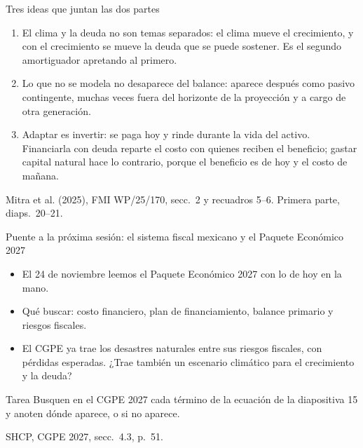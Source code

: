 \documentclass[aspectratio=169,11pt]{beamer}
\newcommand{\fuente}[1]{\par\vfill{\small\color{cGris}#1\par}}
\newcommand{\FMI}{Mitra et al. (2025), FMI WP/25/170}
\begin{document}
\begin{frame}{Tres ideas que juntan las dos partes}
  \begin{enumerate}
    \item<1-> El clima y la deuda no son temas separados: el clima mueve el crecimiento, y con el crecimiento se mueve la deuda que se puede sostener. Es el segundo amortiguador apretando al primero.
    \item<2-> Lo que no se modela no desaparece del balance: aparece después como pasivo contingente, muchas veces fuera del horizonte de la proyección y a cargo de otra generación.
    \item<3-> Adaptar es invertir: se paga hoy y rinde durante la vida del activo. Financiarla con deuda reparte el costo con quienes reciben el beneficio; gastar capital natural hace lo contrario, porque el beneficio es de hoy y el costo de mañana.
  \end{enumerate}
  \fuente{\FMI, secc.~2 y recuadros 5--6. Primera parte, diaps.~20--21.}
\end{frame}

\begin{frame}{Puente a la próxima sesión: el sistema fiscal mexicano y el Paquete Económico 2027}
  \begin{itemize}
    \item<1-> El 24 de noviembre leemos el Paquete Económico 2027 con lo de hoy en la mano.
    \item<2-> Qué buscar: costo financiero, plan de financiamiento, balance primario y riesgos fiscales.
    \item<3-> El CGPE ya trae los desastres naturales entre sus riesgos fiscales, con pérdidas esperadas. ¿Trae también un escenario climático para el crecimiento y la deuda?
  \end{itemize}
  \vfill
  \begin{block}{Tarea}
    Busquen en el CGPE 2027 cada término de la ecuación de la diapositiva 15 y anoten dónde aparece, o si no aparece.
  \end{block}
  \fuente{SHCP, CGPE 2027, secc.~4.3, p.~51.}
\end{frame}
\end{document}
